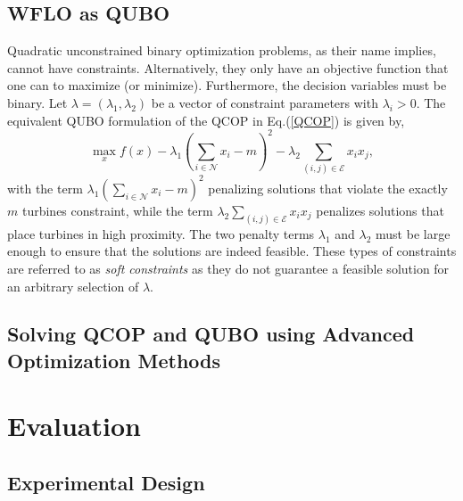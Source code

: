 \documentclass[preprint,12pt]{elsarticle}
\begin{document}
\subsection{WFLO as QUBO}

Quadratic unconstrained binary optimization problems, as their name implies, cannot have constraints. Alternatively, they only 
have an objective function that 
one can to maximize (or minimize). Furthermore, the decision variables must be binary. Let $\lambda = (\lambda_1,\lambda_2)$ 
be a vector of constraint parameters with $\lambda_i >0$. The equivalent QUBO formulation of the QCOP in Eq.(\ref{QCOP}) is given by,
\begin{equation}\max_{x}^{} f(x) - \lambda_1 (\sum_{i \in \mathcal{N}}^{} x_i -m) ^2 - \lambda_2 \sum_{(i,j) \in \mathcal{E}}^{} x_i x_j , \label{QUBO}\end{equation}
with the term $ \lambda_1 (\sum_{i \in \mathcal{N}}^{} x_i -m) ^2$ 
penalizing solutions that violate the exactly $m$ turbines constraint, while the term $\lambda_2 \sum_{(i,j) \in \mathcal{E}}^{} x_i x_j$ penalizes
solutions that place turbines in high proximity. The two penalty terms $\lambda_1$ and $\lambda_2$ 
must be large enough to ensure that the solutions are indeed feasible. These types of constraints
are referred to as \emph{soft constraints} as they do not guarantee a feasible solution 
for an arbitrary selection of $\lambda$.   


\subsection{Solving QCOP and QUBO using Advanced Optimization Methods}


\section{Evaluation}
\label{sec:eval}


\subsection{Experimental Design}
\end{document}
